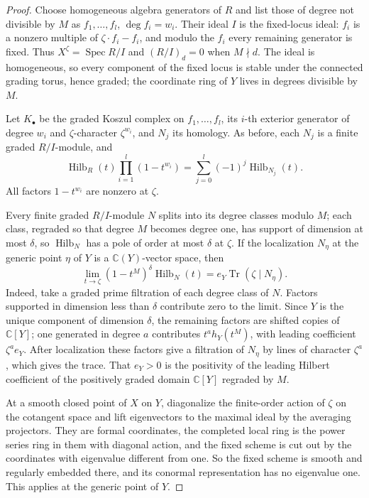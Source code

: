 \documentclass[11pt,a4paper]{article}
\theoremstyle{definition}
\newcommand{\C}{\mathbb{C}}
\newcommand{\Hilb}{\operatorname{Hilb}}
\newcommand{\Spec}{\operatorname{Spec}}
\newcommand{\Tr}{\operatorname{Tr}}
\begin{document}
\begin{proof}
Choose homogeneous algebra generators of $R$ and list those of degree not
divisible by $M$ as $f_1,\dots,f_l$, $\deg f_i=w_i$. Their ideal $I$ is the
fixed-locus ideal: $f_i$ is a nonzero multiple of $\zeta\cdot f_i-f_i$, and
modulo the $f_i$ every remaining generator is fixed. Thus $X^\zeta=\Spec R/I$
and $(R/I)_d=0$ when $M\nmid d$. The ideal is homogeneous, so every component
of the fixed locus is stable under the connected grading torus, hence graded;
the coordinate ring of $Y$ lives in degrees divisible by $M$.

Let $K_\bullet$ be the graded Koszul complex on $f_1,\dots,f_l$, its $i$-th
exterior generator of degree $w_i$ and $\zeta$-character $\zeta^{w_i}$, and
$N_j$ its homology. As before, each $N_j$ is a finite graded $R/I$-module, and
\begin{equation}\label{eq:euler}
 \Hilb_R(t)\prod_{i=1}^l(1-t^{w_i})=\sum_{j=0}^l(-1)^j\Hilb_{N_j}(t).
\end{equation}
All factors $1-t^{w_i}$ are nonzero at $\zeta$.

Every finite graded $R/I$-module $N$ splits into its degree classes modulo
$M$; each class, regraded so that degree $M$ becomes degree one, has support
of dimension at most $\delta$, so $\Hilb_N$ has a pole of order at most
$\delta$ at $\zeta$. If the localization $N_\eta$ at the generic point $\eta$
of $Y$ is a $\C(Y)$-vector space, then
\begin{equation}\label{eq:leading}
 \lim_{t\to\zeta}(1-t^M)^\delta\Hilb_N(t)=e_Y\Tr(\zeta\mid N_\eta).
\end{equation}
Indeed, take a graded prime filtration of each degree class of $N$. Factors
supported in dimension less than $\delta$ contribute zero to the limit. Since
$Y$ is the unique component of dimension $\delta$, the remaining factors are
shifted copies of $\C[Y]$; one generated in degree $a$ contributes
$t^ah_Y(t^M)$, with leading coefficient $\zeta^ae_Y$. After localization
these factors give a filtration of $N_\eta$ by lines of character $\zeta^a$,
which gives the trace. That $e_Y>0$ is the positivity of the leading Hilbert
coefficient of the positively graded domain $\C[Y]$ regraded by $M$.

At a smooth closed point of $X$ on $Y$, diagonalize the finite-order action of
$\zeta$ on the cotangent space and lift eigenvectors to the maximal ideal by
the averaging projectors. They are formal coordinates, the completed local
ring is the power series ring in them with diagonal action, and the fixed
scheme is cut out by the coordinates with eigenvalue different from one. So
the fixed scheme is smooth and regularly embedded there, and its conormal
representation has no eigenvalue one. This applies at the generic point of
$Y$.


\end{proof}
\end{document}
